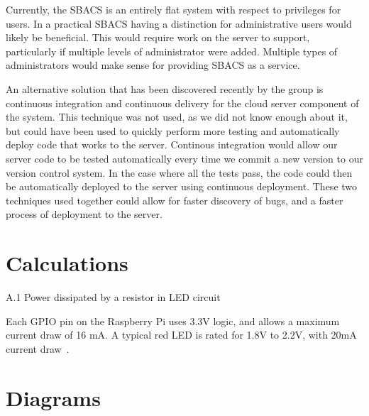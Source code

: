 \documentclass[12pt]{report}
\begin{document}
Currently, the SBACS is an entirely flat system with respect to privileges for users. In a practical SBACS having a
distinction for administrative users would likely be beneficial. This would require work on the server to support,
particularly if multiple levels of administrator were added. Multiple types of administrators would make sense for
providing SBACS as a service.

An alternative solution that has been discovered recently by the group is continuous integration and continuous
delivery for the cloud server component of the system. This technique was not used, as we did not know enough about
it, but could have been used to quickly perform more testing and automatically deploy code that works to the server.
Continous integration would allow our server code to be tested automatically every time we commit a new version to our
version control system. In the case where all the tests pass, the code could then be automatically deployed to the
server using continuous deployment. These two techniques used together could allow for faster discovery of bugs, and
a faster process of deployment to the server.


\printbibliography


\appendix


\chapter{Calculations} \label{appendix:calculations}

A.1 Power dissipated by a resistor in LED circuit

Each GPIO pin on the Raspberry Pi uses 3.3V logic, and allows a maximum current draw of 16 mA. A typical red LED is 
rated for 1.8V to 2.2V, with 20mA current draw~\autocite{REDLED}.


\chapter{Diagrams} \label{appendix:diagrams}
\end{document}
